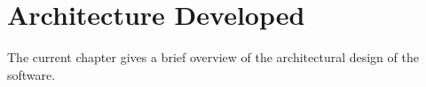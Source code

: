 \chapter{Architecture Developed}

	The current chapter gives a brief overview of the architectural design of
	the software.

